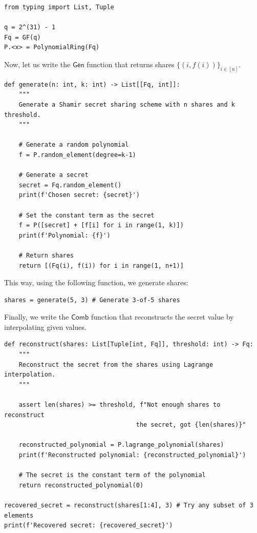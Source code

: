 \documentclass[../../book.tex]{subfiles}
\begin{document}
\begin{verbatim}
from typing import List, Tuple

q = 2^(31) - 1
Fq = GF(q)
P.<x> = PolynomialRing(Fq)
\end{verbatim}

Now, let us write the $\mathsf{Gen}$ function that returns shares $\{(i, f(i))\}_{i \in [n]}$.

\begin{verbatim}
def generate(n: int, k: int) -> List[[Fq, int]]:
    """
    Generate a Shamir secret sharing scheme with n shares and k threshold.
    """

    # Generate a random polynomial
    f = P.random_element(degree=k-1)
    
    # Generate a secret
    secret = Fq.random_element()
    print(f'Chosen secret: {secret}')

    # Set the constant term as the secret
    f = P([secret] + [f[i] for i in range(1, k)])
    print(f'Polynomial: {f}')
    
    # Return shares
    return [(Fq(i), f(i)) for i in range(1, n+1)]
\end{verbatim}

This way, using the following function, we generate shares:

\vspace{-6px}
\begin{verbatim}
shares = generate(5, 3) # Generate 3-of-5 shares
\end{verbatim}
\vspace{-6px}

Finally, we write the $\mathsf{Comb}$ function that reconstructs the secret value by interpolating given values.

\begin{verbatim}
def reconstruct(shares: List[Tuple[int, Fq]], threshold: int) -> Fq:
    """
    Reconstruct the secret from the shares using Lagrange interpolation.
    """
    
    assert len(shares) >= threshold, f"Not enough shares to reconstruct 
                                    the secret, got {len(shares)}"

    reconstructed_polynomial = P.lagrange_polynomial(shares)
    print(f'Reconstructed polynomial: {reconstructed_polynomial}')

    # The secret is the constant term of the polynomial
    return reconstructed_polynomial(0)

recovered_secret = reconstruct(shares[1:4], 3) # Try any subset of 3 elements
print(f'Recovered secret: {recovered_secret}')
\end{verbatim}
\end{document}

